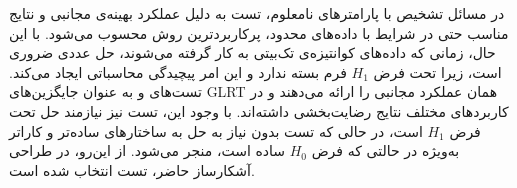 
در مسائل تشخیص با پارامترهای نامعلوم، تست  به دلیل عملکرد بهینه‌ی مجانبی و نتایج مناسب حتی در شرایط با داده‌های محدود، پرکاربردترین روش محسوب می‌شود. با این حال، زمانی که داده‌های کوانتیزه‌ی تک‌بیتی به کار گرفته می‌شوند، حل عددی  ضروری است، زیرا  تحت فرض
$H_1$
فرم بسته ندارد و این امر پیچیدگی محاسباتی ایجاد می‌کند. تست‌های  و  به عنوان جایگزین‌های GLRT همان عملکرد مجانبی را ارائه می‌دهند و در کاربردهای مختلف نتایج رضایت‌بخشی داشته‌اند. با وجود این، تست  نیز نیازمند حل  تحت فرض 
$H_1$
است، در حالی‌ که تست  بدون نیاز به حل  به ساختارهای ساده‌تر و کاراتر به‌ویژه در حالتی که فرض 
$H_0$
ساده است، منجر می‌شود. از این‌رو، در طراحی آشکارساز حاضر، تست  انتخاب شده است.

